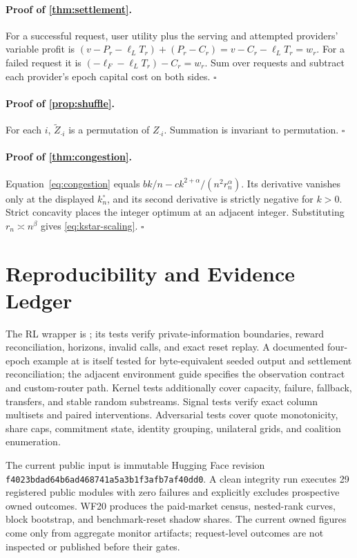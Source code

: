 \documentclass[10pt]{article}
\newcommand{\1}{\mathbf 1}
\begin{document}
\paragraph{Proof of \cref{thm:settlement}.}
For a successful request, user utility plus the serving and attempted providers'
variable profit is
$(v-P_r-\ell_LT_r)+(P_r-C_r)=v-C_r-\ell_LT_r=w_r$.
For a failed request it is
$(-\ell_F-\ell_LT_r)-C_r=w_r$.  Sum over requests and subtract each provider's
epoch capital cost on both sides. \hfill$\square$

\paragraph{Proof of \cref{prop:shuffle}.}
For each $i$, $\widetilde Z_{\cdot i}$ is a permutation of $Z_{\cdot i}$.
Summation is invariant to permutation. \hfill$\square$

\paragraph{Proof of \cref{thm:congestion}.}
Equation~\eqref{eq:congestion} equals
$bk/n-c k^{2+\alpha}/(n^2r_n^\alpha)$.  Its derivative vanishes only at the
displayed $k_n^\circ$, and its second derivative is strictly negative for
$k>0$.  Strict concavity places the integer optimum at an adjacent integer.
Substituting $r_n\asymp n^\beta$ gives \cref{eq:kstar-scaling}.
\hfill$\square$

\section{Reproducibility and Evidence Ledger}

The RL wrapper is ; its tests verify
private-information boundaries, reward reconciliation, horizons, invalid calls,
and exact reset replay.  A documented four-epoch example at
 is itself tested for
byte-equivalent seeded output and settlement reconciliation; the adjacent
environment guide specifies the observation contract and custom-router path.
Kernel tests additionally cover capacity, failure,
fallback, transfers, and stable random substreams.  Signal tests verify exact
column multisets and paired interventions.  Adversarial tests cover quote
monotonicity, share caps, commitment state, identity grouping, unilateral grids,
and coalition enumeration.

The current public input is immutable Hugging Face revision
\texttt{f4023bdad64b6ad468741a5a3b1f3afb7af40dd0}.  A clean integrity run
executes 29 registered public modules with zero failures and explicitly excludes
prospective owned outcomes.  WF20 produces the paid-market census, nested-rank
curves, block bootstrap, and benchmark-reset shadow shares.  The current owned
figures come only from aggregate monitor artifacts; request-level outcomes are
not inspected or published before their gates.
\end{document}
